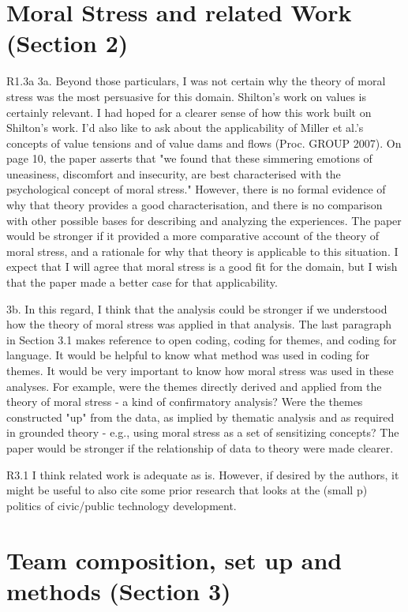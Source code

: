 
\section{Moral Stress and related Work (Section 2)}

R1.3a
3a. Beyond those particulars, I was not certain why the theory of moral stress was the most persuasive for this domain. Shilton's work on values is certainly relevant. I had hoped for a clearer sense of how this work built on Shilton's work. I'd also like to ask about the applicability of Miller et al.'s concepts of value tensions and of value dams and flows (Proc. GROUP 2007). On page 10, the paper asserts that "we found that these simmering emotions of uneasiness, discomfort and insecurity, are best characterised with the psychological concept of moral stress." However, there is no formal evidence of why that theory provides a good characterisation, and there is no comparison with other possible bases for describing and analyzing the experiences. The paper would be stronger if it provided a more comparative account of the theory of moral stress, and a rationale for why that theory is applicable to this situation. I expect that I will agree that moral stress is a good fit for the domain, but I wish that the paper made a better case for that applicability.

3b. In this regard, I think that the analysis could be stronger if we understood how the theory of moral stress was applied in that analysis. The last paragraph in Section 3.1 makes reference to open coding, coding for themes, and coding for language. It would be helpful to know what method was used in coding for themes. It would be very important to know how moral stress was used in these analyses. For example, were the themes directly derived and applied from the theory of moral stress - a kind of confirmatory analysis? Were the themes constructed "up" from the data, as implied by thematic analysis and as required in grounded theory - e.g., using moral stress as a set of sensitizing concepts? The paper would be stronger if the relationship of data to theory were made clearer.

R3.1
I think related work is adequate as is. However, if desired by the authors, it might be useful to also cite some prior research that looks at the (small p) politics of civic/public technology development.



\section{Team composition, set up and methods (Section 3)}
 
